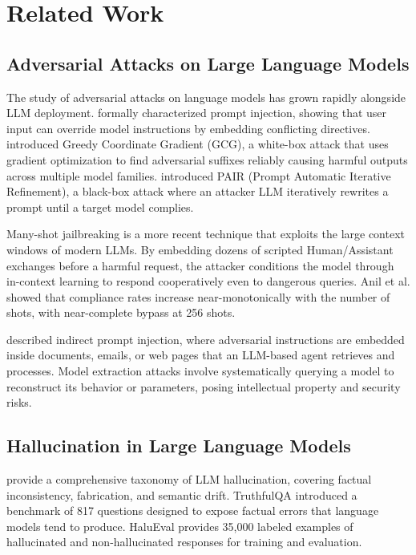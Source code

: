 \documentclass[preprint,12pt,authoryear]{elsarticle}
\begin{document}
\section{Related Work}
\label{sec:related}

\subsection{Adversarial Attacks on Large Language Models}

The study of adversarial attacks on language models has grown rapidly
alongside LLM deployment. \citet{perez2022ignore} formally characterized
prompt injection, showing that user input can override model instructions
by embedding conflicting directives. \citet{zou2023universal} introduced
Greedy Coordinate Gradient (GCG), a white-box attack that uses gradient
optimization to find adversarial suffixes reliably causing harmful
outputs across multiple model families. \citet{chao2023jailbreaking}
introduced PAIR (Prompt Automatic Iterative Refinement), a black-box
attack where an attacker LLM iteratively rewrites a prompt until a
target model complies.

Many-shot jailbreaking \citep{anil2024manyshot} is a more recent
technique that exploits the large context windows of modern LLMs.
By embedding dozens of scripted Human/Assistant exchanges before a
harmful request, the attacker conditions the model through in-context
learning to respond cooperatively even to dangerous queries. Anil et al.
showed that compliance rates increase near-monotonically with the number
of shots, with near-complete bypass at 256 shots.

\citet{greshake2023indirect} described indirect prompt injection, where
adversarial instructions are embedded inside documents, emails, or web
pages that an LLM-based agent retrieves and processes. Model extraction
attacks \citep{tramer2016stealing} involve systematically querying a
model to reconstruct its behavior or parameters, posing intellectual
property and security risks.

\subsection{Hallucination in Large Language Models}

\citet{ji2023survey} provide a comprehensive taxonomy of LLM
hallucination, covering factual inconsistency, fabrication, and
semantic drift. TruthfulQA \citep{lin2022truthfulqa} introduced a
benchmark of 817 questions designed to expose factual errors that
language models tend to produce. HaluEval \citep{li2023halueval}
provides 35,000 labeled examples of hallucinated and non-hallucinated
responses for training and evaluation.
\end{document}
